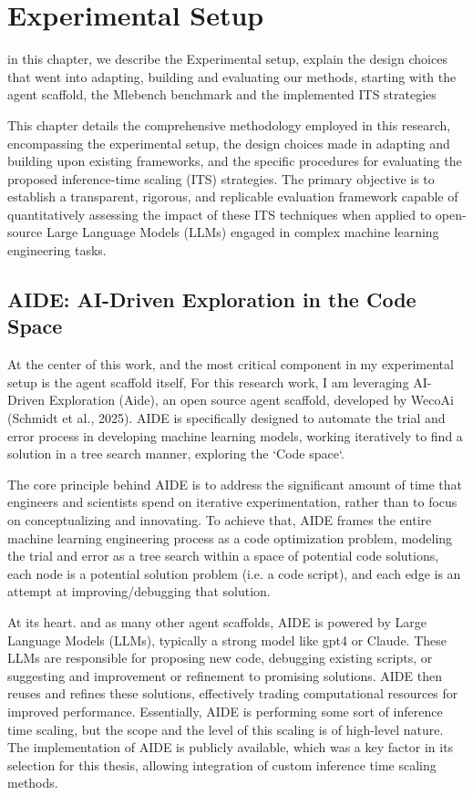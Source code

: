 \chapter{Experimental Setup}
in this chapter, we describe the Experimental setup, explain the design choices that went into adapting, building and evaluating our methods, starting with the agent scaffold, the Mlebench benchmark and the implemented ITS strategies

This chapter details the comprehensive methodology employed in this research, encompassing the experimental setup, the design choices made in adapting and building upon existing frameworks, and the specific procedures for evaluating the proposed inference-time scaling (ITS) strategies. The primary objective is to establish a transparent, rigorous, and replicable evaluation framework capable of quantitatively assessing the impact of these ITS techniques when applied to open-source Large Language Models (LLMs) engaged in complex machine learning engineering tasks.

\section{AIDE: AI-Driven Exploration in the Code Space}
At the center of this work, and the most critical component in my experimental setup is the agent scaffold itself, For this research work, I am leveraging AI-Driven Exploration (Aide), an open source agent scaffold, developed by WecoAi (Schmidt et al., 2025). AIDE is specifically designed to automate the trial and error process in developing machine learning models, working iteratively to find a solution in a tree search manner, exploring the `Code space`. 

The core principle behind AIDE is to address the significant amount of time that engineers and scientists spend on iterative experimentation, rather than to focus on conceptualizing and innovating.  To achieve that, AIDE frames the entire machine learning engineering process as a code optimization problem, modeling the trial and error as a tree search within a space of potential code solutions, each node is a potential solution problem (i.e. a code script), and each edge is an attempt at improving/debugging that solution.

At its heart. and as many other agent scaffolds, AIDE is powered by Large Language Models (LLMs), typically a strong model like gpt4 or Claude. These LLMs are responsible for proposing new code, debugging existing scripts, or suggesting and improvement or refinement to promising solutions. AIDE then reuses and refines these solutions, effectively trading computational resources for improved performance. Essentially, AIDE is performing some sort of inference time scaling, but the scope and the level of this scaling is of high-level nature. The implementation of AIDE is publicly available, which was a key factor in its selection for this thesis, allowing integration of custom inference time scaling methods.


